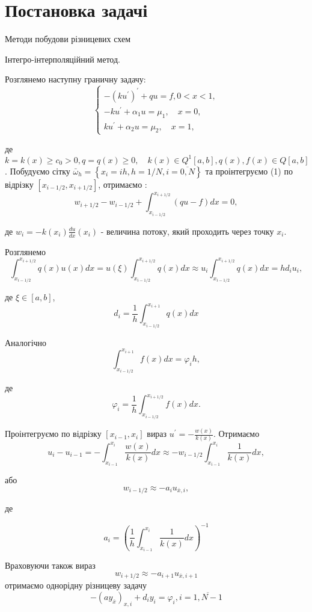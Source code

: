 \chapter{Постановка задачі}

Методи побудови різницевих схем

Інтегро-інтерполяційний метод.

Розглянемо наступну граничну задачу:
$$
\left\{\begin{array}{l}
-\left(k u^{\prime}\right)^{\prime}+q u=f, 0<x<1, \\
-k u^{\prime}+\alpha_1 u=\mu_1, \quad x=0, \\
k u^{\prime}+\alpha_2 u=\mu_2, \quad x=1,
\end{array}\right.
$$

де $k=k(x) \geq c_0>0, q=q(x) \geq 0, \quad k(x) \in Q^1[a, b], q(x), f(x) \in Q[a, b]$.
Побудуємо сітку $\bar{\omega}_h=\left\{x_i=i h, h=1 / N, i=\overline{0, N}\right\}$ та проінтегруємо (1) по відрізку $\left[x_{i-1 / 2}, x_{i+1 / 2}\right]$, отримаємо :
$$
w_{i+1 / 2}-w_{i-1 / 2}+\int_{x_{i-1 / 2}}^{x_{i+1 / 2}}(q u-f) d x=0,
$$

де $w_i=-k\left(x_i\right) \frac{d u}{d x}\left(x_i\right)$ - величина потоку, який проходить через точку $x_i$.

Розглянемо
$$
\int_{x_{i-1 / 2}}^{x_{i+1 / 2}} q(x) u(x) d x=u(\xi) \int_{x_{i-1 / 2}}^{x_{i+1 / 2}} q(x) d x \approx u_i \int_{x_{i-1 / 2}}^{x_{i+1 / 2}} q(x) d x=h d_i u_i,
$$

де $\xi \in[a, b]$,
$$
d_i=\frac{1}{h} \int_{x_{i-1 / 2}}^{x_{i+1}} q(x) d x
$$

Аналогічно
$$
\int_{x_{i-1 / 2}}^{x_{i+1}} f(x) d x=\varphi_i h,
$$

де
$$
\varphi_i=\frac{1}{h} \int_{x_{i-1 / 2}}^{x_{i+1 / 2}} f(x) d x .
$$

Проінтегруємо по відрізку $\left[x_{i-1}, x_i\right]$ вираз $u^{\prime} =-\frac{w(x)}{k(x)}$. Отримаємо
$$
u_i-u_{i-1}=-\int_{x_{i-1}}^{x_i} \frac{w(x)}{k(x)} d x \approx-w_{i-1 / 2} \int_{x_{i-1}}^{x_i} \frac{1}{k(x)} d x,
$$

або
$$
w_{i-1 / 2} \approx-a_i u_{\bar{x}, i},
$$

де


$$
a_i=\left(\frac{1}{h} \int_{x_{i-1}}^{x_i} \frac{1}{k(x)} d x\right)^{-1}
$$

Враховуючи також вираз
$$
w_{i+1 / 2} \approx-a_{i+1} u_{\overline{x}, i+1}
$$
отримаємо однорідну різницеву задачу
$$
-\left(a y_{\bar{x}}\right)_{x, i}+d_i y_i=\varphi_i, i=\overline{1, N-1}
$$

